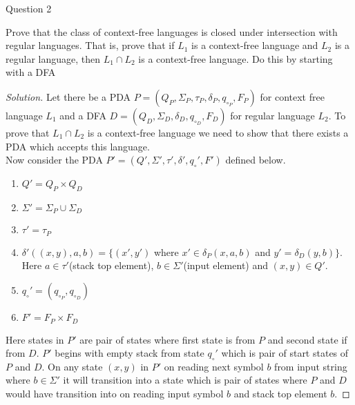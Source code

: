 \begin{solution}{Question 2}\label{ques:2}
    \begin{question}
    Prove that the class of context-free languages is closed under intersection with regular languages. That is, prove that if $L_1$ is a context-free language and $L_2$ is a regular language, then $L_1 \cap L_2$ is a context-free language. Do this by starting with a DFA
    \end{question}
    \tcblower{}
    \begin{proof}[Solution]
    Let there be a PDA $P = (Q_P, \Sigma_P, \tau_P, \delta_P, q_{\circ_P}, F_P)$ for context free language $L_1$ and a DFA $D = (Q_D, \Sigma_D, \delta_D, q_{\circ_D}, F_D)$ for regular language $L_2$. To prove that $L_1 \cap L_2$ is a context-free language we need to show that there exists a PDA which accepts this language.\\
    Now consider the PDA $P' = (Q', \Sigma', \tau', \delta', q_{\circ}', F')$ defined below.
    
    \begin{enumerate}
        \item $Q' = Q_P \times Q_D$
        \item $\Sigma' = \Sigma_P \cup \Sigma_D$
        \item $\tau' = \tau_P$
        \item $\delta'((x, y), a, b) = \{(x', y')$ where $x'\in \delta_P(x, a, b)$ and $y' =  \delta_D(y, b) \}$.\\ 
            Here $a \in \tau'$(stack top element), $b \in \Sigma'$(input element) and $(x, y) \in Q'$.
        \item $q_{\circ}' = (q_{\circ_P},  q_{\circ_D})$
        \item $F' = F_P \times F_D$
    \end{enumerate}
    
    Here states in $P'$ are pair of states where first state is from $P$ and second state if from $D$. $P'$ begins with empty stack from state $q_{\circ}'$ which is pair of start states of $P$ and $D$. On any state $(x, y)$ in $P'$ on reading next symbol $b$ from input string where $b \in \Sigma'$ it will transition into a state which is pair of states where $P$ and $D$ would have transition into on reading input symbol $b$ and stack top element $b$. 
    

\end{proof}
\end{solution}

